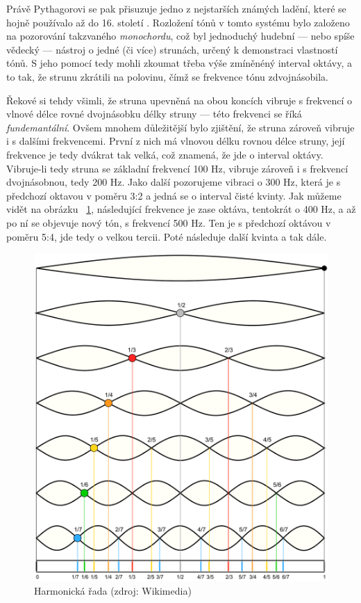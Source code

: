 \documentclass[12pt]{article}
\begin{document}
Právě Pythagorovi se pak přisuzuje jedno z nejstarších známých ladění, které se hojně používalo až do 16. století \cite{smolka}. Rozložení tónů v tomto systému bylo založeno na pozorování takzvaného \emph{monochordu}, což byl jednoduchý hudební — nebo spíše vědecký — nástroj o jedné (či více) strunách, určený k demonstraci vlastností tónů. S jeho pomocí tedy mohli zkoumat třeba výše zmíněnéný interval oktávy, a to tak, že strunu zkrátili na polovinu, čímž se frekvence tónu zdvojnásobila.

Řekové si tehdy všimli, že struna upevněná na obou koncích vibruje s frekvencí o vlnové délce rovné dvojnásobku délky struny — této frekvenci se říká \emph{fundemantální}. Ovšem mnohem důležitější bylo zjištění, že struna zároveň vibruje i s dalšími frekvencemi. První z nich má vlnovou délku rovnou délce struny, její frekvence je tedy dvákrat tak velká, což znamená, že jde o interval oktávy. Vibruje-li tedy struna se základní frekvencí 100 Hz, vibruje zároveň i s frekvencí dvojnásobnou, tedy 200 Hz. Jako další pozorujeme vibraci o 300 Hz, která je s předchozí oktavou v poměru 3:2 a jedná se o interval čisté kvinty. Jak můžeme vidět na obrázku ~\ref{fig:harmonics}, následující frekvence je zase oktáva, tentokrát o 400 Hz, a až po ní se objevuje nový tón, s frekvencí 500 Hz. Ten je s předchozí oktávou v poměru 5:4, jde tedy o velkou tercii. Poté následuje další kvinta a tak dále.

\begin{figure}[p]\centering
	\includegraphics[width = .9 \textwidth]{harmonics.pdf}
	\caption{Harmonická řada (zdroj: Wikimedia)}
	\label{fig:harmonics}
\end{figure}
\end{document}

